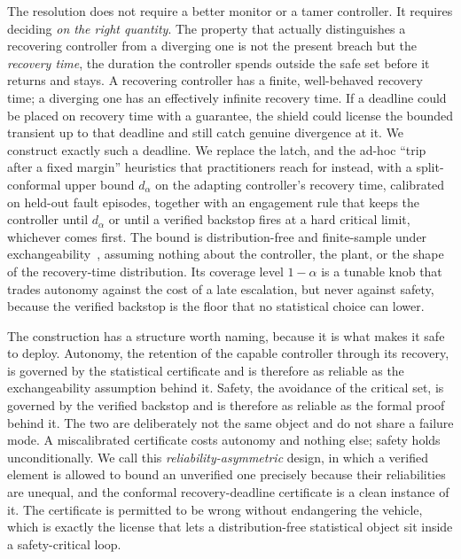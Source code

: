 \documentclass[journal]{IEEEtran}
\theoremstyle{plain}
\theoremstyle{definition}
\newcommand{\dalpha}{d_{\alpha}}
\begin{document}
The resolution does not require a better monitor or a tamer controller. It requires deciding
\emph{on the right quantity}. The property that actually distinguishes a recovering
controller from a diverging one is not the present breach but the \emph{recovery time}, the
duration the controller spends outside the safe set before it returns and stays. A recovering
controller has a finite, well-behaved recovery time; a diverging one has an effectively
infinite recovery time. If a deadline could be placed on recovery time with a guarantee, the
shield could license the bounded transient up to that deadline and still catch genuine
divergence at it. We construct exactly such a deadline. We replace the latch, and the ad-hoc
``trip after a fixed margin'' heuristics that practitioners reach for instead, with a
split-conformal upper bound $\dalpha$ on the adapting controller's recovery time, calibrated
on held-out fault episodes, together with an engagement rule that keeps the controller until
$\dalpha$ or until a verified backstop fires at a hard critical limit, whichever comes first.
The bound is distribution-free and finite-sample under exchangeability~\cite{Vovk2005,Lei2018,Angelopoulos2023},
assuming nothing about the controller, the plant, or the shape of the recovery-time
distribution. Its coverage level $1-\alpha$ is a tunable knob that trades autonomy against
the cost of a late escalation, but never against safety, because the verified backstop is the
floor that no statistical choice can lower.

The construction has a structure worth naming, because it is what makes it safe to deploy.
Autonomy, the retention of the capable controller through its recovery, is governed by the
statistical certificate and is therefore as reliable as the exchangeability assumption
behind it. Safety, the avoidance of the critical set, is governed by the verified backstop
and is therefore as reliable as the formal proof behind it. The two are deliberately not the
same object and do not share a failure mode. A miscalibrated certificate costs autonomy and
nothing else; safety holds unconditionally. We call this \emph{reliability-asymmetric}
design, in which a verified element is allowed to bound an unverified one precisely because
their reliabilities are unequal, and the conformal recovery-deadline certificate is a clean
instance of it. The certificate is permitted to be wrong without endangering the vehicle,
which is exactly the license that lets a distribution-free statistical object sit inside a
safety-critical loop.
\end{document}
